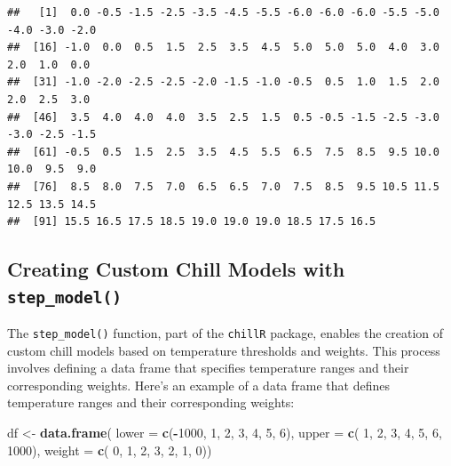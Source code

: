 \documentclass[
]{article}
\newenvironment{Shaded}{\begin{snugshade}}{\end{snugshade}}
\newcommand{\AttributeTok}[1]{\textcolor[rgb]{0.13,0.29,0.53}{#1}}
\newcommand{\DecValTok}[1]{\textcolor[rgb]{0.00,0.00,0.81}{#1}}
\newcommand{\FunctionTok}[1]{\textcolor[rgb]{0.13,0.29,0.53}{\textbf{#1}}}
\newcommand{\NormalTok}[1]{#1}
\newcommand{\OtherTok}[1]{\textcolor[rgb]{0.56,0.35,0.01}{#1}}
\newcommand{\SpecialCharTok}[1]{\textcolor[rgb]{0.81,0.36,0.00}{\textbf{#1}}}
\begin{document}
\begin{verbatim}
##   [1]  0.0 -0.5 -1.5 -2.5 -3.5 -4.5 -5.5 -6.0 -6.0 -6.0 -5.5 -5.0 -4.0 -3.0 -2.0
##  [16] -1.0  0.0  0.5  1.5  2.5  3.5  4.5  5.0  5.0  5.0  4.0  3.0  2.0  1.0  0.0
##  [31] -1.0 -2.0 -2.5 -2.5 -2.0 -1.5 -1.0 -0.5  0.5  1.0  1.5  2.0  2.0  2.5  3.0
##  [46]  3.5  4.0  4.0  4.0  3.5  2.5  1.5  0.5 -0.5 -1.5 -2.5 -3.0 -3.0 -2.5 -1.5
##  [61] -0.5  0.5  1.5  2.5  3.5  4.5  5.5  6.5  7.5  8.5  9.5 10.0 10.0  9.5  9.0
##  [76]  8.5  8.0  7.5  7.0  6.5  6.5  7.0  7.5  8.5  9.5 10.5 11.5 12.5 13.5 14.5
##  [91] 15.5 16.5 17.5 18.5 19.0 19.0 19.0 18.5 17.5 16.5
\end{verbatim}

\subsection{\texorpdfstring{Creating Custom Chill Models with \texttt{step\_model()}}{Creating Custom Chill Models with step\_model()}}\label{creating-custom-chill-models-with-step_model}

The \texttt{step\_model()} function, part of the \texttt{chillR} package, enables the creation of custom chill models based on temperature thresholds and weights. This process involves defining a data frame that specifies temperature ranges and their corresponding weights. Here's an example of a data frame that defines temperature ranges and their corresponding weights:

\begin{Shaded}
\begin{Highlighting}[]
\NormalTok{df }\OtherTok{\textless{}{-}} \FunctionTok{data.frame}\NormalTok{(}
  \AttributeTok{lower =} \FunctionTok{c}\NormalTok{(}\SpecialCharTok{{-}}\DecValTok{1000}\NormalTok{, }\DecValTok{1}\NormalTok{, }\DecValTok{2}\NormalTok{, }\DecValTok{3}\NormalTok{, }\DecValTok{4}\NormalTok{, }\DecValTok{5}\NormalTok{,    }\DecValTok{6}\NormalTok{),}
  \AttributeTok{upper =} \FunctionTok{c}\NormalTok{(    }\DecValTok{1}\NormalTok{, }\DecValTok{2}\NormalTok{, }\DecValTok{3}\NormalTok{, }\DecValTok{4}\NormalTok{, }\DecValTok{5}\NormalTok{, }\DecValTok{6}\NormalTok{, }\DecValTok{1000}\NormalTok{),}
  \AttributeTok{weight =} \FunctionTok{c}\NormalTok{(   }\DecValTok{0}\NormalTok{, }\DecValTok{1}\NormalTok{, }\DecValTok{2}\NormalTok{, }\DecValTok{3}\NormalTok{, }\DecValTok{2}\NormalTok{, }\DecValTok{1}\NormalTok{,    }\DecValTok{0}\NormalTok{))}
\end{Highlighting}
\end{Shaded}
\end{document}
